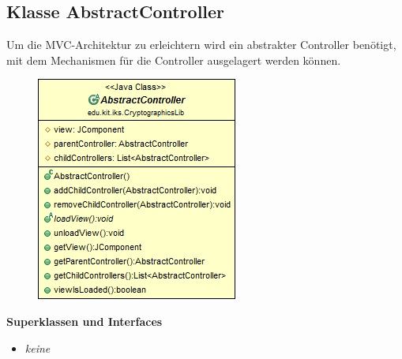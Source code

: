 \documentclass{article}
\begin{document}
  	  \subsection{Klasse AbstractController}
	  Um die MVC-Architektur zu erleichtern wird ein abstrakter Controller benötigt, mit dem Mechanismen
	  für die Controller ausgelagert werden können.
	
      \begin{figure}[H]
        \centering
        \includegraphics[width=\textwidth]{resources/edu-kit-iks-CryptographicsLib-AbstractController}
      \end{figure}
	
      \textbf{Superklassen und Interfaces}
      \begin{itemize}
        \item \textit{keine}
      \end{itemize}
	
\end{document}
